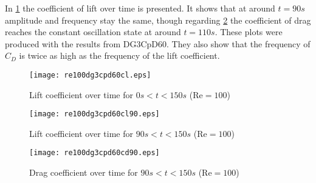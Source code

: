 In \cref{osci100} the coefficient of lift over time is presented. It shows that at around $t=90s$ amplitude and frequency stay the same, though regarding 
\cref{cdosci100} the coefficient of drag reaches the constant oscillation state at around $t=110s$. These plots were produced with the results from DG3CpD60. They also show that the frequency of $C_D$ is twice as high as the frequency of the lift coefficient. 
\begin{figure}[htp]	
	\centering
	\texttt{[image: re100dg3cpd60cl.eps]}
	\caption{Lift coefficient over time for $0s<t<150s$ ($\text{Re}=100$)}
	\label{osci100}	
\end{figure}
\begin{figure}[htp]	
	\begin{minipage}[b]{0.45\textwidth}
		\centering
		\texttt{[image: re100dg3cpd60cl90.eps]}
		\caption{Lift coefficient over time for $90s<t<150s$ ($\text{Re}=100$)}
		\label{cl10090}
	\end{minipage}
	\quad
	\begin{minipage}[b]{0.45\textwidth}
		\centering
		\texttt{[image: re100dg3cpd60cd90.eps]}
		\caption{Drag coefficient over time for $90s<t<150s$ ($\text{Re}=100$)}
		\label{cdosci100}	
	\end{minipage}
\end{figure}
	
